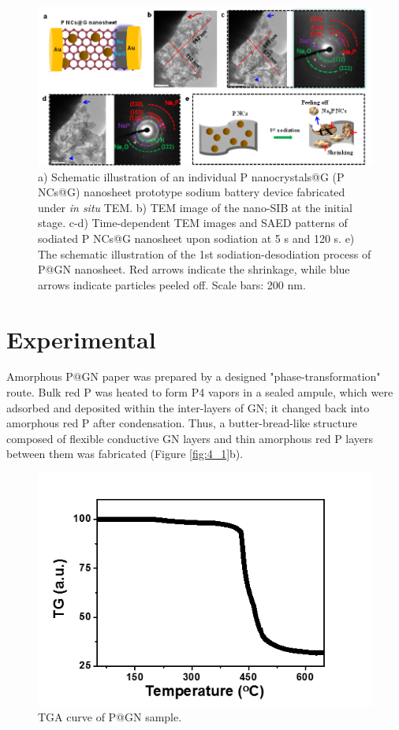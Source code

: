 \begin{figure} 
\centering
\includegraphics[width=\textwidth,angle=0]{figures/figure4_s3}
\caption[Design and characterizations of PNCs@G]
{a) Schematic illustration of an individual P nanocrystals@G (P NCs@G) nanosheet prototype sodium battery device fabricated under {\it in situ} TEM. b) TEM image of the nano-SIB at the initial stage. c-d) Time-dependent TEM images and SAED patterns of sodiated P NCs@G nanosheet upon sodiation at 5 s and 120 s. e) The schematic illustration of the 1st sodiation-desodiation process of P@GN nanosheet. Red arrows indicate the shrinkage, while blue arrows indicate particles peeled off. Scale bars: 200 nm. 
\label{fig:4_s3}}
\end{figure}

\section{Experimental}
Amorphous P@GN paper was prepared by a designed "phase-transformation" route. Bulk red P was heated to form P4 vapors in a sealed ampule, which were adsorbed and deposited within the inter-layers of GN; it changed back into amorphous red P after condensation.\cite{Roth1947b} Thus, a butter-bread-like structure composed of flexible conductive GN layers and thin amorphous red P layers between them was fabricated (Figure \ref{fig:4_1}b). 

\begin{figure}  
\centering
\includegraphics[width=320pt]{figures/figure4_s4}
\caption[TGA curve of P@GN]
{TGA curve of P@GN sample.
\label{fig:4_s4}}
\end{figure}


